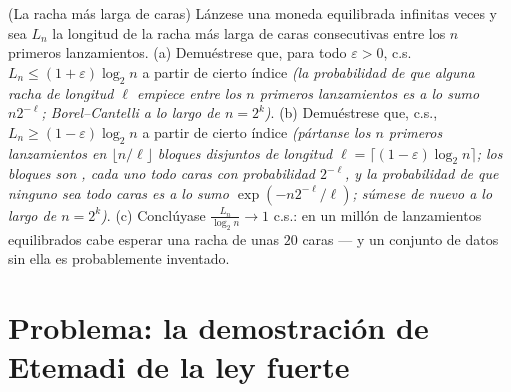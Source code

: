 \begin{exercise}[$\star\star$]\label{exo:b3:probability:12}
(La racha más larga de caras) Lánzese una moneda equilibrada infinitas
veces y sea $L_n$ la longitud de la racha más larga de caras
consecutivas entre los $n$ primeros lanzamientos. (a) Demuéstrese que,
para todo $\varepsilon > 0$, c.s.\ $L_n \leq
(1 + \varepsilon)\log_2n$ a partir de cierto índice \emph{(la
probabilidad de que alguna racha de longitud $\ell$ empiece entre los
$n$ primeros lanzamientos es a lo sumo $n2^{-\ell}$; Borel--Cantelli a
lo largo de $n =
2^k$)}. (b) Demuéstrese que, c.s., $L_n \geq (1 - \varepsilon)\log_2n$ a
partir de cierto índice \emph{(pártanse los $n$ primeros lanzamientos en
$\lfloor n/\ell\rfloor$ bloques disjuntos de longitud $\ell =
\lceil(1 - \varepsilon)\log_2n\rceil$; los bloques son
, cada uno todo
caras con probabilidad $2^{-\ell}$, y la probabilidad de que ninguno sea
todo caras es a lo sumo $\exp(-n2^{-\ell}/\ell)$; súmese de nuevo a lo
largo de $n = 2^k$)}. (c) Conclúyase $\frac{L_n}{\log_2n} \to 1$ c.s.:
en un millón de lanzamientos equilibrados cabe esperar una racha de unas
$20$ caras --- y un conjunto de datos sin ella es probablemente
inventado.
\end{exercise}

\section{Problema: la demostración de Etemadi de la ley fuerte}

